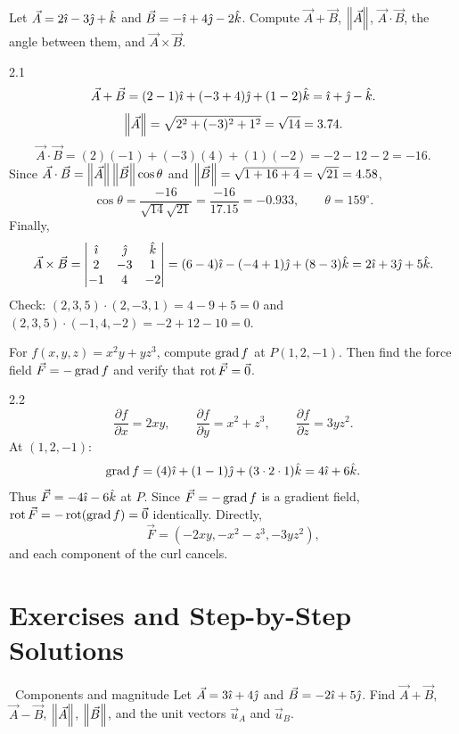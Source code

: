 \begin{worked}
Let $\vec A=2\hat{\imath}-3\hat{\jmath}+\hat{k}$ and $\vec B=-\hat{\imath}+4\hat{\jmath}-2\hat{k}$. Compute
$\vec A+\vec B$, $\left\lVert \vec A \right\rVert$, $\vec A\cdot\vec B$, the angle between them, and
$\vec A\times\vec B$.
\end{worked}

\begin{solution}{2.1}
\[
\vec A+\vec B=(2-1)\hat{\imath}+(-3+4)\hat{\jmath}+(1-2)\hat{k}
=\hat{\imath}+\hat{\jmath}-\hat{k}.
\]
\[
\left\lVert \vec A \right\rVert=\sqrt{2^2+(-3)^2+1^2}=\sqrt{14}=3.74.
\]
\[
\vec A\cdot\vec B=(2)(-1)+(-3)(4)+(1)(-2)
=-2-12-2=-16.
\]
Since $\vec A\cdot\vec B=\left\lVert \vec A \right\rVert\left\lVert \vec B \right\rVert\cos\theta$ and
$\left\lVert \vec B \right\rVert=\sqrt{1+16+4}=\sqrt{21}=4.58$,
\[
\cos\theta=\frac{-16}{\sqrt{14}\sqrt{21}}
=\frac{-16}{17.15}=-0.933,
\qquad
\theta=159^\circ.
\]
Finally,
\[
\vec A\times\vec B=
\begin{vmatrix}
\hat{\imath}&\hat{\jmath}&\hat{k}\\
2&-3&1\\
-1&4&-2
\end{vmatrix}
=(6-4)\hat{\imath}-(-4+1)\hat{\jmath}+(8-3)\hat{k}
=2\hat{\imath}+3\hat{\jmath}+5\hat{k}.
\]
Check: $(2,3,5)\cdot(2,-3,1)=4-9+5=0$ and
$(2,3,5)\cdot(-1,4,-2)=-2+12-10=0$.
\end{solution}

\begin{worked}
For $f(x,y,z)=x^2y+yz^3$, compute $\operatorname{grad} f$ at $P(1,2,-1)$. Then find the force
field $\vec F=-\operatorname{grad} f$ and verify that $\operatorname{rot}\vec F=\vec{0}$.
\end{worked}

\begin{solution}{2.2}
\[
\frac{\partial f}{\partial x}=2xy,\qquad
\frac{\partial f}{\partial y}=x^2+z^3,\qquad
\frac{\partial f}{\partial z}=3yz^2.
\]
At $(1,2,-1)$:
\[
\operatorname{grad} f=(4)\hat{\imath}+(1-1)\hat{\jmath}+(3\cdot2\cdot1)\hat{k}
=4\hat{\imath}+6\hat{k}.
\]
Thus $\vec F=-4\hat{\imath}-6\hat{k}$ at $P$. Since $\vec F=-\operatorname{grad} f$ is a gradient
field, $\operatorname{rot}\vec F=-\operatorname{rot}(\operatorname{grad} f)=\vec{0}$ identically. Directly,
\[
\vec F=(-2xy,-x^2-z^3,-3yz^2),
\]
and each component of the curl cancels.
\end{solution}

\section{Exercises and Step-by-Step Solutions}

\begin{exercise}{\warm\ Components and magnitude}
Let $\vec A=3\hat{\imath}+4\hat{\jmath}$ and $\vec B=-2\hat{\imath}+5\hat{\jmath}$. Find
$\vec A+\vec B$, $\vec A-\vec B$, $\left\lVert \vec A \right\rVert$, $\left\lVert \vec B \right\rVert$, and the unit
vectors $\vec u_A$ and $\vec u_B$.
\end{exercise}

